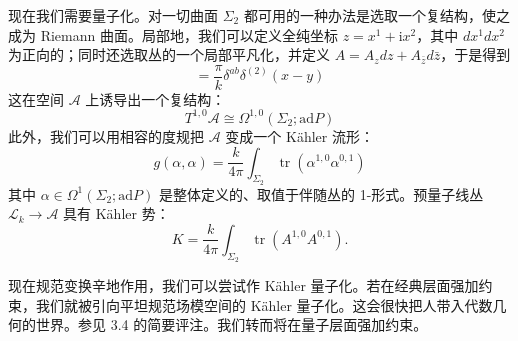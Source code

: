 现在我们需要量子化。对一切曲面 $\Sigma_2$ 都可用的一种办法是选取一个复结构，使之成为 Riemann 曲面。局部地，我们可以定义全纯坐标 $z=x^{1}+\mathrm{i}x^{2}$，其中 $dx^{1}dx^{2}$ 为正向的；同时还选取丛的一个局部平凡化，并定义 $A=A_{z}dz+A_{\bar z}d\bar z$，于是得到
\begin{equation}
  [A^{a}_{z}(x),A^{b}_{\bar z}(y)]=\frac{\pi}{k}\delta^{ab}\delta^{(2)}(x-y)
  \tag{3.40}
  \label{eq:3.40}
\end{equation}
这在空间 $\mathcal{A}$ 上诱导出一个复结构：
\begin{equation}
  T^{1,0}\mathcal{A}\cong\Omega^{1,0}(\Sigma_2;\mathrm{ad}P)
  \tag{3.41}
  \label{eq:3.41}
\end{equation}
此外，我们可以用相容的度规把 $\mathcal{A}$ 变成一个 Kähler 流形：
\begin{equation}
  g(\alpha,\alpha)=\frac{k}{4\pi}\int_{\Sigma_2}\operatorname{tr}\left(\alpha^{1,0}\alpha^{0,1}\right)
  \tag{3.42}
  \label{eq:3.42}
\end{equation}
其中 $\alpha\in\Omega^{1}(\Sigma_2;\mathrm{ad}P)$ 是整体定义的、取值于伴随丛的 1-形式。预量子线丛 $\mathcal{L}_{k}\to\mathcal{A}$ 具有 Kähler 势：
\begin{equation}
  K=\frac{k}{4\pi}\int_{\Sigma_2}\operatorname{tr}\left(A^{1,0}A^{0,1}\right).
  \tag{3.43}
  \label{eq:3.43}
\end{equation}

现在规范变换辛地作用，我们可以尝试作 Kähler 量子化。若在经典层面强加约束，我们就被引向平坦规范场模空间的 Kähler 量子化。这会很快把人带入代数几何的世界。参见 3.4 的简要评注。我们转而将在量子层面强加约束。

